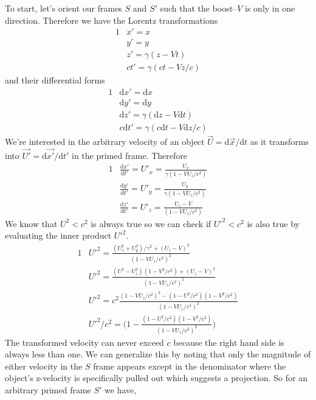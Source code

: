 \documentclass[]{article}
\numberwithin{equation}{subsection}
\begin{document}
\noindent To start, let's orient our frames $S$ and $S'$ such that the boost--$V$ is only in one direction. Therefore we have the Lorentz transformations 
\begin{alignat}{1}
	\label{a01}	&x'=x\\
	\label{a02}	&y'=y\\
	\label{a03}	&z'=\gamma(z-Vt)\\
	\label{a04}	&ct'=\gamma(ct-Vz/c)
\end{alignat}
and their differential forms
\begin{alignat}{1}
	\label{a05}	&\mathrm{d}x'=\mathrm{d}x\\
	\label{a06}	&\mathrm{d}y'=\mathrm{d}y\\
	\label{a07}	&\mathrm{d}z'=\gamma(\mathrm{d}z-V\mathrm{d}t)\\
	\label{a08}	&c\mathrm{d}t'=\gamma(c\mathrm{d}t-V\mathrm{d}z/c)	
\end{alignat}
We're interested in the arbitrary velocity of an object $\vec{U}=\mathrm{d}\vec{x}/\mathrm{d}t$ as it transforms into $\vec{U'}=\mathrm{d}\vec{x'}/\mathrm{d}t'$ in the primed frame. Therefore
\begin{alignat}{1}
	\label{009}	&\frac{\mathrm{d}x'}{\mathrm{d}t'}=U'_{x}=\frac{U_{x}}{\gamma(1-VU_{z}/c^{2})}\\
	\label{010}	&\frac{\mathrm{d}y'}{\mathrm{d}t'}=U'_{y}=\frac{U_{y}}{\gamma(1-VU_{z}/c^{2})}\\
	\label{011}	&\frac{\mathrm{d}z'}{\mathrm{d}t'}=U'_{z}=\frac{U_{z}-V}{(1-VU_{z}/c^{2})}
\end{alignat}
We know that $U^{2}<c^{2}$ is always true so we can check if ${U'}^{2}<c^{2}$ is also true by evaluating the inner product ${U'}^{2}$.
\begin{alignat}{1}
	\label{a12}	&{U'}^{2}=\frac{(U_{x}^{2}+U_{y}^{2})/\gamma^{2}+(U_{z}-V)^{2}}{(1-VU_{z}/c^{2})^{2}}\\
	\label{a13}	&{U'}^{2}=\frac{(U^{2}-U_{z}^{2})(1-V^{2}/c^{2})+(U_{z}-V)^{2}}{(1-VU_{z}/c^{2})^{2}}\\
	\label{a14}	&{U'}^{2}=c^{2}\frac{(1-VU_{z}/c^{2})^{2}-(1-U^{2}/c^{2})(1-V^{2}/c^{2})}{(1-VU_{z}/c^{2})^{2}}\\
	\label{a15}	&{U'}^{2}/c^{2}=\Big(1-\frac{(1-U^{2}/c^{2})(1-V^{2}/c^{2})}{(1-VU_{z}/c^{2})^{2}}\Big)
\end{alignat}
The transformed velocity can never exceed $c$ because the right hand side is always less than one. We can generalize this by noting that only the magnitude of either velocity in the $S$ frame appears except in the denominator where the object's z-velocity is specifically pulled out which suggests a projection. So for an arbitrary primed frame $S'$ we have,  
\end{document}
